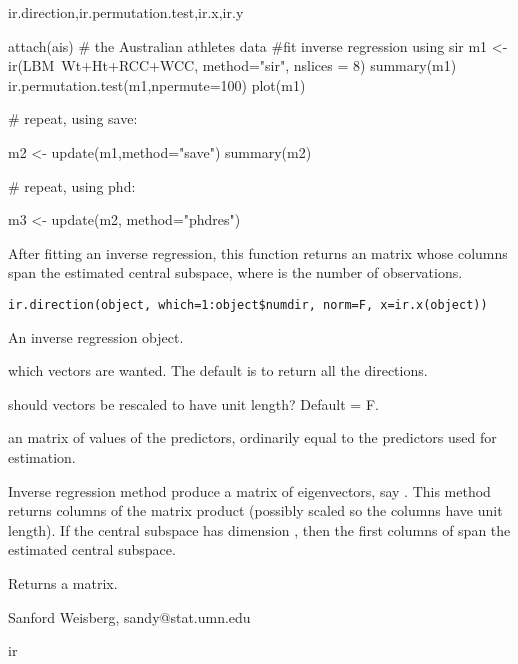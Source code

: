 \documentclass[letterpaper]{book}
\begin{document}
\begin{SeeAlso}\relax
ir.direction,ir.permutation.test,ir.x,ir.y\end{SeeAlso}
\begin{Examples}
\begin{ExampleCode}
attach(ais)  # the Australian athletes data
#fit inverse regression using sir
m1 <- ir(LBM~Wt+Ht+RCC+WCC, method="sir", nslices = 8)
summary(m1)
ir.permutation.test(m1,npermute=100)
plot(m1)

# repeat, using save:

m2 <- update(m1,method="save")
summary(m2)

# repeat, using phd:

m3 <- update(m2, method="phdres")
\end{ExampleCode}
\end{Examples}

\begin{Description}\relax
After fitting an inverse regression, this function returns an 
 matrix whose columns span the estimated
central subspace, where  is the number of observations.\end{Description}
\begin{Usage}
\begin{verbatim}
ir.direction(object, which=1:object$numdir, norm=F, x=ir.x(object))
\end{verbatim}
\end{Usage}
\begin{Arguments}
\begin{ldescription}
\item[\code{object}] An inverse regression object.
\item[\code{which}] which vectors are wanted.  The default is to return all the
directions.
\item[\code{norm}] should vectors be rescaled to have unit length? Default = F.
\item[\code{x}] 
\end{ldescription}
an  matrix of values of the 
predictors, ordinarily equal to the predictors used for estimation.\end{Arguments}
\begin{Details}\relax
Inverse regression method produce a matrix of eigenvectors, say .  This
method returns columns of the matrix product  (possibly scaled so the 
columns have unit length).  If the central subspace has dimension ,
then the first  columns of  span the estimated central
subspace.\end{Details}
\begin{Value}
Returns a matrix.\end{Value}
\begin{Author}\relax
Sanford Weisberg, sandy@stat.umn.edu\end{Author}
\begin{SeeAlso}\relax
ir\end{SeeAlso}
\end{document}
